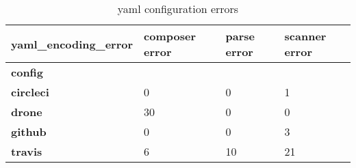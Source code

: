 \begin {table}[!htbp]

\caption{yaml configuration errors}
\label{table_yaml_errors}
\begin{tabular}{|l|l|l|l|}
\hline
\textbf{yaml\_encoding\_error} &  composer error &  parse error &  scanner error \\ \hline
\textbf{config  } &                 &              &                \\ \hline

\textbf{circleci} &               0 &            0 &              1 \\ \hline
\textbf{drone   } &              30 &            0 &              0 \\ \hline
\textbf{github  } &               0 &            0 &              3 \\ \hline
\textbf{travis  } &               6 &           10 &             21 \\ \hline

\end{tabular}
\end{table}
